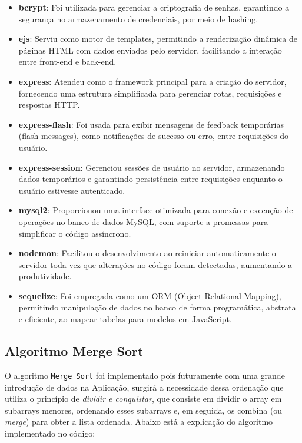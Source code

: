 \begin{itemize}
\item \textbf{bcrypt}: Foi utilizada para gerenciar a criptografia de senhas, garantindo a segurança no armazenamento de credenciais, por meio de hashing.
\item \textbf{ejs}: Serviu como motor de templates, permitindo a renderização dinâmica de páginas HTML com dados enviados pelo servidor, facilitando a interação entre front-end e back-end.
\item \textbf{express}: Atendeu como o framework principal para a criação do servidor, fornecendo uma estrutura simplificada para gerenciar rotas, requisições e respostas HTTP.
\item \textbf{express-flash}: Foi usada para exibir mensagens de feedback temporárias (flash messages), como notificações de sucesso ou erro, entre requisições do usuário.
\item \textbf{express-session}: Gerenciou sessões de usuário no servidor, armazenando dados temporários e garantindo persistência entre requisições enquanto o usuário estivesse autenticado.
\item \textbf{mysql2}: Proporcionou uma interface otimizada para conexão e execução de operações no banco de dados MySQL, com suporte a promessas para simplificar o código assíncrono.
\item \textbf{nodemon}: Facilitou o desenvolvimento ao reiniciar automaticamente o servidor toda vez que alterações no código foram detectadas, aumentando a produtividade.
\item \textbf{sequelize}: Foi empregada como um ORM (Object-Relational Mapping), permitindo manipulação de dados no banco de forma programática, abstrata e eficiente, ao mapear tabelas para modelos em JavaScript.
\end{itemize}

\subsection{Algoritmo Merge Sort}

O algoritmo \texttt{Merge Sort} foi implementado pois futuramente com uma grande introdução de dados na Aplicação, surgirá a necessidade dessa ordenação que utiliza o princípio de \textit{dividir e conquistar}, que consiste em dividir o array em subarrays menores, ordenando esses subarrays e, em seguida, os combina (ou \textit{merge}) para obter a lista ordenada. Abaixo está a explicação do algoritmo implementado no código:

